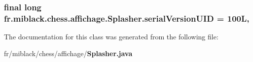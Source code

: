 \subsubsection[{serial\-Version\-U\-I\-D}]{\setlength{\rightskip}{0pt plus 5cm}final long fr.\-miblack.\-chess.\-affichage.\-Splasher.\-serial\-Version\-U\-I\-D = 100\-L\hspace{0.3cm}{\ttfamily [static]}, {\ttfamily [private]}}\label{classfr_1_1miblack_1_1chess_1_1affichage_1_1Splasher_a061c4d477e52a7c0c9e487161782f910}


The documentation for this class was generated from the following file\-:\begin{DoxyCompactItemize}
\item 
fr/miblack/chess/affichage/{\bf Splasher.\-java}\end{DoxyCompactItemize}
